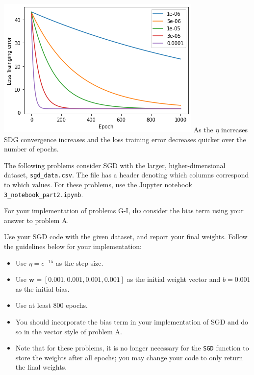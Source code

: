 \begin{solution}
\includegraphics[scale = .5]{set1/images/SDGConv.png}\newline
As the $\eta$ increases SDG convergence increases and the loss training error decreases quicker over the number of epochs.
\end{solution}


The following problems consider SGD with the larger, higher-dimensional dataset, \texttt{sgd_data.csv}. The file has a header denoting which columns correspond to which values. For these problems, use the Jupyter notebook \texttt{3_notebook_part2.ipynb}.

For your implementation of problems G-I, \textbf{do} consider the bias term using your answer to problem A.

\begin{problem}[6]
  Use your SGD code with the given dataset, and report your final weights. Follow the guidelines below for your implementation:

  \begin{itemize}
    \item Use $\eta = e^{-15}$ as the step size.  
    \item Use $\mathbf{w} = [0.001, 0.001, 0.001, 0.001]$ as the initial weight vector and $b = 0.001$ as the initial bias.
    \item Use at least 800 epochs.
    \item You should incorporate the bias term in your implementation of SGD and do so in the vector style of problem A.
    \item Note that for these problems, it is no longer necessary for the \texttt{SGD} function to store the weights after all epochs; you may change your code to only return the final weights.
  \end{itemize}
\end{problem}
\begin{solution}
\end{solution}

